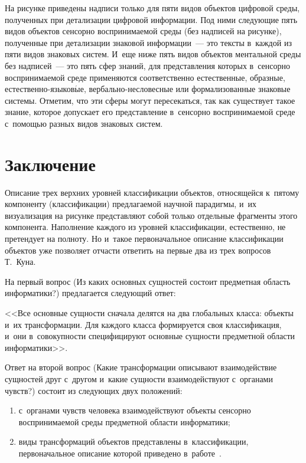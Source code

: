 \begin{multicols}{2}
    На рисунке приведены надписи только для пяти видов объектов цифровой 
среды, полученных при детализации циф\-ро\-вой информации. Под ними 
следующие пять видов объектов сенсорно вос\-при\-ни\-ма\-емой среды (без 
надписей на рисунке), полученные при детализации знаковой информации~--- 
это тексты в~каж\-дой из пяти видов знаковых сис\-тем. И~еще ниже пять видов 
объектов ментальной среды без надписей~--- это пять сфер знаний, для 
пред\-став\-ле\-ния которых в~сенсорно вос\-при\-ни\-ма\-емой среде применяются 
соответственно естественные, образные, 
 естест\-вен\-но-язы\-ко\-в$\acute{\mbox{ы}}$е, вер\-баль\-но-не\-сло\-вес\-ные 
или формализованные знаковые сис\-те\-мы. Отметим, что эти сферы могут 
пересекаться, так как существует такое знание, которое допускает его 
пред\-став\-ле\-ние в~сенсорно вос\-при\-ни\-ма\-емой среде с~помощью разных видов 
знаковых сис\-тем.

\vspace*{-6pt}
    
\section{Заключение}

\vspace*{-3pt}

    Описание трех верхних уровней классификации объектов, относящейся 
к~пятому компоненту (классификации) предлагаемой научной парадигмы, и~их 
визуализация на рисунке представляют собой только отдельные фрагменты 
этого компонента. Наполнение каждого из уровней классификации, 
естественно, не претендует на полноту. Но и~такое первоначальное описание 
классификации объектов уже позволяет отчасти ответить на первые два из трех 
вопросов Т.~Куна.
    
    На первый вопрос (Из каких основных сущностей состоит предметная 
область информатики?) предлагается следующий ответ:
    
    <<Все основные сущности сначала делятся на два глобальных класса: 
объекты и~их трансформации. Для каждого класса формируется своя 
классификация, и~они в~совокупности специфицируют основные сущности 
предметной области информатики>>.
    
    Ответ на второй вопрос (Какие трансформации описывают взаимодействие 
сущностей друг с~другом и~какие сущности взаимодействуют с~органами 
чувств?) состоит из сле\-ду\-ющих двух положений:
    \begin{enumerate}[(1)]
    \item с~органами чувств человека взаимодействуют объекты сенсорно 
воспринимаемой среды предметной области информатики;\\[-14pt]
    \item виды трансформаций объектов представлены в~классификации, 
первоначальное описание которой приведено в~работе~\cite{15-zac}.
    \end{enumerate}
    

\end{multicols}
